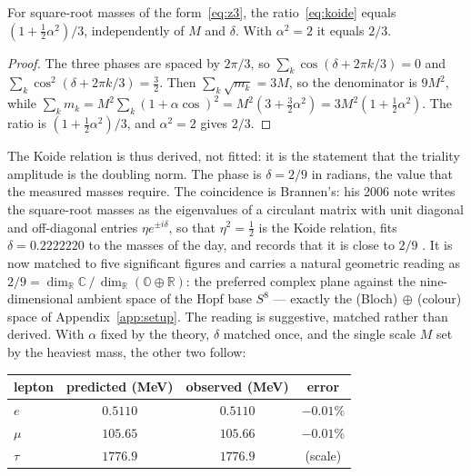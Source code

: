 \begin{proposition}\label{prop:koide}
For square-root masses of the form~\eqref{eq:z3}, the ratio~\eqref{eq:koide} equals
$(1 + \tfrac12\alpha^2)/3$, independently of $M$ and $\delta$. With $\alpha^2 = 2$ it equals $2/3$.
\end{proposition}

\begin{proof}
The three phases are spaced by $2\pi/3$, so $\sum_k \cos(\delta + 2\pi k/3) = 0$ and
$\sum_k \cos^2(\delta + 2\pi k/3) = \tfrac32$. Then $\sum_k\sqrt{m_k} = 3M$, so the denominator is
$9M^2$, while $\sum_k m_k = M^2\sum_k(1+\alpha\cos)^2 = M^2(3 + \tfrac32\alpha^2) = 3M^2(1+\tfrac12\alpha^2)$.
The ratio is $(1+\tfrac12\alpha^2)/3$, and $\alpha^2=2$ gives $2/3$.
\end{proof}

The Koide relation is thus derived, not fitted: it is the statement that the triality amplitude
is the doubling norm. The phase is $\delta = 2/9$ in radians, the value that the measured masses
require. The coincidence is Brannen's: his 2006 note writes the square-root masses as the
eigenvalues of a circulant matrix with unit diagonal and off-diagonal entries $\eta e^{\pm
i\delta}$, so that $\eta^2 = \tfrac12$ is the Koide relation, fits $\delta = 0.2222220$ to the
masses of the day, and records that it is close to $2/9$ \autocite{brannen2006lepton}. It is now
matched to five significant figures and carries a natural geometric reading as $2/9 =
\dim_{\mathbb{R}}\mathbb{C} \,/\, \dim_{\mathbb{R}}(\mathbb{O}\oplus\mathbb{R})$: the preferred
complex plane against the nine-dimensional ambient space of the Hopf base $S^8$ --- exactly the
(Bloch)$\,\oplus\,$(colour) space of Appendix~\ref{app:setup}. The reading is suggestive,
matched rather than derived. With $\alpha$ fixed by the theory, $\delta$ matched once, and the
single scale $M$ set by the heaviest mass, the other two follow:

\begin{center}
\begin{tabular}{lccc}
\hline
lepton & predicted (MeV) & observed (MeV) & error \\
\hline
$e$    & $0.5110$  & $0.5110$  & $-0.01\%$ \\
$\mu$  & $105.65$  & $105.66$  & $-0.01\%$ \\
$\tau$ & $1776.9$  & $1776.9$  & (scale) \\
\hline
\end{tabular}
\end{center}

